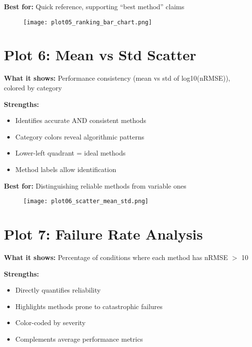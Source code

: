 \documentclass[11pt]{article}
\begin{document}
\textbf{Best for:} Quick reference, supporting ``best method'' claims

\begin{figure}[h]
\centering
\texttt{[image: plot05\_ranking\_bar\_chart.png]}
\end{figure}

\clearpage


\section*{Plot 6: Mean vs Std Scatter}

\textbf{What it shows:} Performance consistency (mean vs std of log10(nRMSE)), colored by category

\textbf{Strengths:}
\begin{itemize}
    \item Identifies accurate AND consistent methods
    \item Category colors reveal algorithmic patterns
    \item Lower-left quadrant = ideal methods
    \item Method labels allow identification
\end{itemize}

\textbf{Best for:} Distinguishing reliable methods from variable ones

\begin{figure}[h]
\centering
\texttt{[image: plot06\_scatter\_mean\_std.png]}
\end{figure}

\clearpage


\section*{Plot 7: Failure Rate Analysis}

\textbf{What it shows:} Percentage of conditions where each method has nRMSE $>$ 10

\textbf{Strengths:}
\begin{itemize}
    \item Directly quantifies reliability
    \item Highlights methods prone to catastrophic failures
    \item Color-coded by severity
    \item Complements average performance metrics
\end{itemize}
\end{document}
